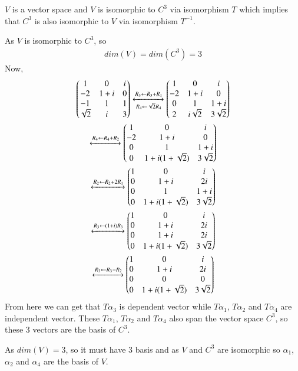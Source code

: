 $V$ is a vector space and $V$ is isomorphic to $C^3$ via isomorphism $T$ which implies that $C^3$ is also isomorphic to $V$ via isomorphism $T^{-1}$. 

As $V$ is isomorphic to $C^3$, so 
\begin{align}
dim(V)= dim(C^3)=3
\end{align}
Now,
\begin{multline}
\begin{pmatrix}1 & 0 & i\\-2 & 1+i & 0\\-1 & 1 & 1\\\sqrt{2} & i & 3\end{pmatrix}\xleftrightarrow[R_4\leftarrow\sqrt{2}R_4]{R_3\leftarrow R_3+R_1}\begin{pmatrix}1 & 0 & i\\-2 & 1+i & 0\\0 & 1 & 1+i\\2 & i\sqrt{2} & 3\sqrt{2}\end{pmatrix}\\
\xleftrightarrow[]{R_4\leftarrow R_4+R_2}\begin{pmatrix}1 & 0 & i\\-2 & 1+i & 0\\0 & 1 & 1+i\\0 & 1+i(1+\sqrt{2}) & 3\sqrt{2}\end{pmatrix}\\
\xleftrightarrow[]{R_2\leftarrow R_2+2R_1}\begin{pmatrix}1 & 0 & i\\0 & 1+i & 2i\\0 & 1 & 1+i\\0 & 1+i(1+\sqrt{2}) & 3\sqrt{2}\end{pmatrix}\\
\xleftrightarrow[]{R_3\leftarrow (1+i)R_3}\begin{pmatrix}1 & 0 & i\\0 & 1+i & 2i\\0 & 1+i & 2i\\0 & 1+i(1+\sqrt{2}) & 3\sqrt{2}\end{pmatrix}\\
\xleftrightarrow[]{R_3\leftarrow R_3-R_2}\begin{pmatrix}1 & 0 & i\\0 & 1+i & 2i\\0 & 0 & 0\\0 & 1+i(1+\sqrt{2}) & 3\sqrt{2}\end{pmatrix}
\end{multline}
From here we can get that $T\alpha_3$ is dependent vector while $T\alpha_1$, $T\alpha_2$ and $T\alpha_4$ are independent vector. These $T\alpha_1$, $T\alpha_2$ and $T\alpha_4$ also span the vector space $C^3$, so these 3 vectors are the basis of $C^3$. 

As $dim(V)=3$, so it must have 3 basis and as $V$ and $C^3$ are isomorphic so $\alpha_1$, $\alpha_2$ and $\alpha_4$ are the basis of $V$.




